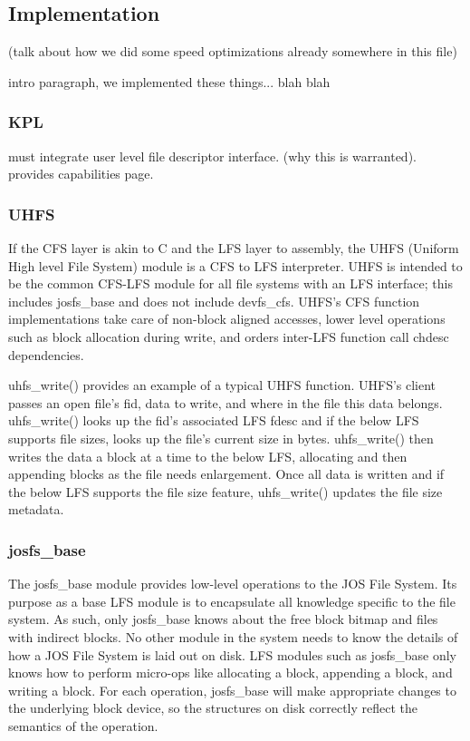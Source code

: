 \subsection{Implementation}
\label{sec:solution:impl}

(talk about how we did some speed optimizations already somewhere in this file)

intro paragraph, we implemented these things... blah blah

\subsubsection{KPL}

must integrate user level file descriptor interface. (why this is
warranted). provides capabilities page.

\subsubsection{UHFS}
\label{sec:solution:impl:uhfs}

If the CFS layer is akin to C and the LFS layer to assembly, the UHFS (Uniform
High level File System) module is a CFS to LFS interpreter. UHFS is intended to
be the common CFS-LFS module for all file systems with an LFS interface; this
includes josfs\_base and does not include devfs\_cfs. UHFS's CFS function
implementations take care of non-block aligned accesses, lower level operations
such as block allocation during write, and orders inter-LFS function call chdesc
dependencies.

uhfs\_write() provides an example of a typical UHFS function. UHFS's client
passes an open file's fid, data to write, and where in the file this data
belongs. uhfs\_write() looks up the fid's associated LFS fdesc and if the below
LFS supports file sizes, looks up the file's current size in bytes.
uhfs\_write() then writes the data a block at a time to the below LFS,
allocating and then appending blocks as the file needs enlargement. Once all
data is written and if the below LFS supports the file size feature,
uhfs\_write() updates the file size metadata.

\subsubsection{josfs\_base}

The josfs\_base module provides low-level operations to the JOS File System.
Its purpose as a base LFS module is to encapsulate all knowledge specific to
the file system. As such, only josfs\_base knows about the free block bitmap
and files with indirect blocks. No other module in the system needs to know the
details of how a JOS File System is laid out on disk. LFS modules such as
josfs\_base only knows how to perform micro-ops like allocating a block,
appending a block, and writing a block. For each operation, josfs\_base will
make appropriate changes to the underlying block device, so the structures on
disk correctly reflect the semantics of the operation.

